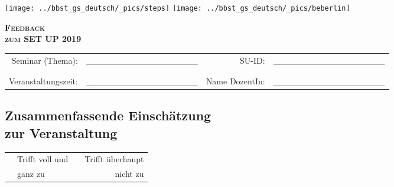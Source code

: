 \documentclass[a4paper]{article}
\begin{document}
\vspace{-0.5cm}

\texttt{[image: ../bbst\_gs\_deutsch/\_pics/steps]} \hspace{4.9cm}
\texttt{[image: ../bbst\_gs\_deutsch/\_pics/beberlin]}

\vspace{.5cm}

\begin{center}
	\textbf{\Huge \scshape Feedback} \\ \vspace{0.3cm}
	\textbf{\huge \scshape zum SET UP 2019}
\end{center}

\vspace{.9cm}

\begin{tabular}{rlrl}
Seminar (Thema): & \_\_\_\_\_\_\_\_\_\_\_\_\_\_\_\_\_\_ &
SU-ID: 					 & \_\_\_\_\_\_\_\_\_\_\_\_\_\_\_\_\_\_ \\
 & \\
 & \\
Veranstaltungszeit: & \_\_\_\_\_\_\_\_\_\_\_\_\_\_\_\_\_\_ &
Name DozentIn: 			& \_\_\_\_\_\_\_\_\_\_\_\_\_\_\_\_\_\_
\end{tabular}

\vspace{.5cm}

\subsection*{Zusammenfassende Einschätzung \\ zur Veranstaltung}

\vspace{-1.3cm}

\begin{tabular}{p{7cm} l p{1cm} r}
	& Trifft voll und & & Trifft überhaupt \\
	& ganz zu 				& & nicht zu
\end{tabular}

\vspace{-.1cm}


 \\
\end{document}
